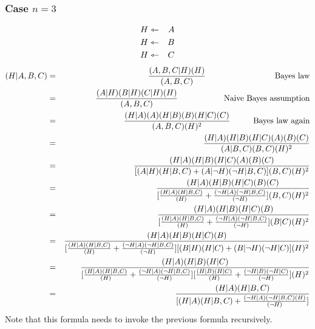 \subsubsection{Case $n=3$}
\begin{eqnarray}
H &\leftarrowtriangle& A \nonumber \\
H &\leftarrowtriangle& B \nonumber \\
H &\leftarrowtriangle& C \nonumber
\end{eqnarray}
\begin{eqnarray}
(H|A,B,C) &=& \frac{ (A,B,C|H)(H) } { (A,B,C) } \tab\tab\tab \mbox{Bayes law} \nonumber \\
 &=& \frac{ (A|H)(B|H)(C|H)(H) }{ (A,B,C) } \tab\tab \mbox{Naive Bayes assumption} \nonumber \\
 &=& \frac{ (H|A)(A)(H|B)(B)(H|C)(C) }{ (A,B,C) (H)^2 } \tab \mbox{Bayes law again} \nonumber \\
 &=& \frac{ (H|A)(H|B)(H|C)(A)(B)(C) }{ (A|B,C)(B,C) (H)^2 } \nonumber \\
 &=& \frac{ (H|A)(H|B)(H|C)(A)(B)(C) }
          { [ (A|H)(H|B,C) + (A|\neg H)(\neg H|B,C) ] (B,C)(H)^2 } \nonumber \\
 &=& \frac{ (H|A)(H|B)(H|C)(B)(C) }
          { [ \frac{(H|A)(H|B,C)}{(H)} + \frac{(\neg H|A)(\neg H|B,C)}{(\neg H)} ] (B,C)(H)^2 } \nonumber \\
 &=& \frac{ (H|A)(H|B)(H|C)(B) }
          { [ \frac{(H|A)(H|B,C)}{(H)} + \frac{(\neg H|A)(\neg H|B,C)}{(\neg H)} ]
            (B|C)(H)^2 } \nonumber \\
 &=& \frac{ (H|A)(H|B)(H|C)(B) }
          { [ \frac{(H|A)(H|B,C)}{(H)} + \frac{(\neg H|A)(\neg H|B,C)}{(\neg H)} ]
            [(B|H)(H|C) + (B|\neg H)(\neg H|C)] (H)^2 } \nonumber \\
 &=& \frac{ (H|A)(H|B)(H|C) }
          { [ \frac{(H|A)(H|B,C)}{(H)} + \frac{(\neg H|A)(\neg H|B,C)}{(\neg H)} ]
            [ \frac{(H|B)(H|C)}{(H)} + \frac{(\neg H|B)(\neg H|C)}{(\neg H)}] (H)^2 } \nonumber \\
 &=& \frac{ (H|A)(H|B,C) }
          { [ (H|A)(H|B,C) + \frac{(\neg H|A)(\neg H|B,C)(H)}{(\neg H)} ] } \nonumber
\end{eqnarray}
Note that this formula needs to invoke the previous formula recursively.

